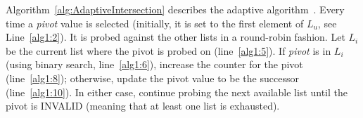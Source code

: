Algorithm~\ref{alg:AdaptiveIntersection} describes the adaptive algorithm~\cite{Demaine2000ASI,DLMI01}. Every time a \emph{pivot} value is selected (initially, it is set to the first element of $L_u$, see Line~\ref{alg1:2}). It is probed against the other lists in a round-robin fashion. Let $L_i$ be the current list where the {pivot} is probed on (line~\ref{alg1:5}). If \emph{pivot} is in $L_i$ (using binary search, line~\ref{alg1:6}), increase the counter for the {pivot} (line~\ref{alg1:8}); otherwise, update the {pivot} value to be the successor (line~\ref{alg1:10}). In either case, continue probing the next available list until the pivot is INVALID (meaning that at least one list is exhausted).



%

